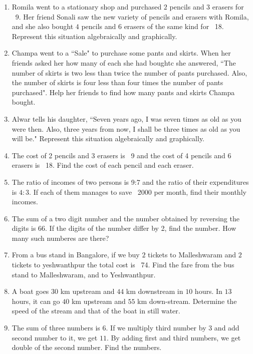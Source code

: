 \begin{enumerate}[label=\thesubsection.\arabic*, ref=\thesubsection.\theenumi]
\item Romila went to a stationary shop and purchased $2$ pencils and $3$ erasers for \rupee~9. Her friend Sonali saw the new variety of pencils and erasers with Romila, and she also bought $4$ pencils and $6$ erasers of the same kind for \rupee~18. Represent this situation algebraically and graphically.
\item Champa went to a ``Sale" to purchase some pants and skirts. When her friends asked her how many of each she had boughtc she answered, ``The number of skirts is two less than twice the number of pants purchased. Also, the number of skirts is four less than four times the number of pants purchased". Help her friends to find how many pants and skirts Champa bought.
\item 
Alwar tells his daughter, ``Seven years ago, I was seven times as old as you were then. Also, three years from now, I shall be three times as old as you will be."   Represent this situation algebraically and graphically.
\item The cost of 2 pencils and 3 erasers is \rupee~9 and the cost of 4 pencils and 6 erasers is \rupee~18. Find the cost of each pencil and each eraser.
\item The ratio of incomes of two persons is 9:7 and the ratio of their expenditures is $4:3$. If each of them manages to save \rupee~2000 per month, find their monthly incomes.
\item The sum of a two digit number and the number obtained by reversing the digits is $66$. If the digits of the number differ by 2, find the number. How many such numberes are there?
\item From a bus stand in Bangalore, if we buy $2$ tickets to Malleshwaram and $2$ tickets to yeshwanthpur the total cost is \rupee~74. Find the fare from the bus stand to Malleshwaram, and to Yeshwanthpur.
\item A boat goes $30$ km upstream and $44$ km downstream in $10$ hours. In $13$ hours, it can go $40$ km upstream and $55$ km down-stream. Determine the speed of the stream and that of the boat in still water.
\item The sum of three numbers is $6$. If we multiply third number by $3$ and add second number to it, we get $11$. By adding first and third numbers, we get double of the second number. Find the numbers. 
\end{enumerate}
